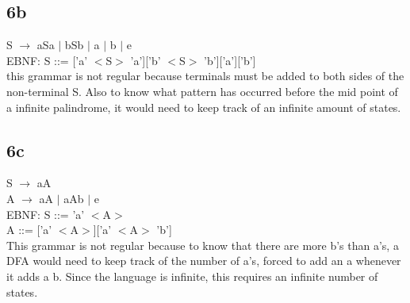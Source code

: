 \documentclass[12pt]{article}
\newcommand\tab[1][1cm]{\hspace*{#1}}
\begin{document}
\subsection{6b}
S $\to$ aSa $|$ bSb $|$ a $|$ b $|$ e 
\noindent \\[0.3cm]
EBNF: S ::= ['a' $<$S$>$ 'a']['b' $<$S$>$ 'b']['a']['b']\\[0.3cm]
this grammar is not regular because terminals must be added to both sides of the non-terminal S. Also to know what pattern has occurred before the mid point of a infinite palindrome, it would need to keep track of an infinite amount of states. 


\subsection{6c}
S $\to$ aA \\
A $\to$ aA $|$ aAb $|$ e
\noindent \\[0.3cm]
EBNF: S ::= 'a' $<$A$>$ \\
\tab[1.2cm] A ::= ['a' $<$A$>$]['a' $<$A$>$ 'b'] \\[0.3cm]
This grammar is not regular because to know that there are more b's than a's, a DFA would need to keep track of the number of a's, forced to add an a whenever it adds a b. Since the language is infinite, this requires an infinite number of states.
\end{document}
